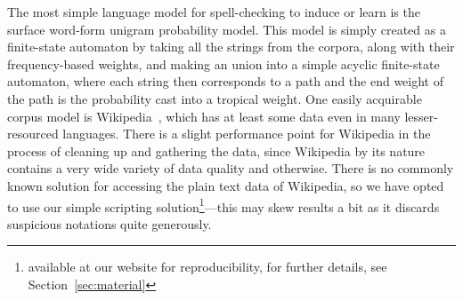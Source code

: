 \documentclass[a4paper,12pt]{article}
\begin{document}
The most simple language model for spell-checking to induce or learn is the
surface word-form unigram probability model. This model is simply created as a
finite-state automaton by taking all the strings from the corpora, along with
their frequency-based weights, and making an union into a simple acyclic
finite-state automaton, where each string then corresponds to a path and the
end weight of the path is the probability cast into a tropical weight. One
easily acquirable corpus model is Wikipedia~\cite[]{pirinen/2010/lrec}, which
has at least some data even in many lesser-resourced languages. There is a
slight performance point for Wikipedia in the process of cleaning up and
gathering the data, since Wikipedia by its nature contains a very wide variety
of data quality and otherwise. There is no commonly known solution for
accessing the plain text data of Wikipedia, so we have opted to use our simple
scripting solution\footnote{available at our website for reproducibility, for
further details, see Section~\ref{sec:material}}---this may skew results a bit
as it discards suspicious notations quite generously.
\end{document}
